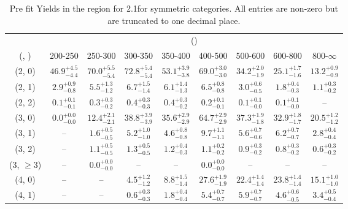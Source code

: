 \begin{table}[h!]
\tiny
\centering
\caption{Pre fit Yields in the \mmj region for 2.1\ifb for symmetric categories. All entries are non-zero but are truncated to one decimal place.\label{tab:prednodatanaive_mumu_comb_sym}}
\begin{tabular}
{ccccccccc}
	\hline\hline
	& \multicolumn{8}{c}{\scalht (\gev)} \\ 
	 (\njet,  \nb) & 200-250 & 250-300 & 300-350 & 350-400 & 400-500 & 500-600 & 600-800 & 800-$\infty$ \\ [0.8ex] 
\hline
	(2, 0) & $46.9^{+ 4.5 }_{- 4.4 }$ & $70.0^{+ 5.5 }_{- 5.4 }$ & $72.8^{+ 5.4 }_{- 5.4 }$ & $53.1^{+ 3.9 }_{- 3.8 }$ & $69.0^{+ 3.0 }_{- 3.0 }$ & $34.2^{+ 2.0 }_{- 1.9 }$ & $25.1^{+ 1.7 }_{- 1.6 }$ & $13.2^{+ 0.9 }_{- 0.9 }$ \\[0.5ex] 
	(2, 1) & $2.9^{+ 0.9 }_{- 0.8 }$ & $5.5^{+ 1.3 }_{- 1.2 }$ & $6.7^{+ 1.5 }_{- 1.4 }$ & $6.1^{+ 1.4 }_{- 1.3 }$ & $6.5^{+ 0.8 }_{- 0.8 }$ & $3.0^{+ 0.6 }_{- 0.5 }$ & $1.8^{+ 0.4 }_{- 0.3 }$ & $1.1^{+ 0.3 }_{- 0.2 }$ \\[0.5ex] 
	(2, 2) & $0.1^{+ 0.1 }_{- 0.1 }$ & $0.3^{+ 0.3 }_{- 0.2 }$ & $0.4^{+ 0.3 }_{- 0.3 }$ & $0.4^{+ 0.3 }_{- 0.2 }$ & $0.2^{+ 0.1 }_{- 0.1 }$ & $0.1^{+ 0.1 }_{- 0.0 }$ & $0.1^{+ 0.1 }_{- 0.0 }$ & -- \\[0.5ex] 
	(3, 0) & $0.0^{+ 0.0 }_{- 0.0 }$ & $12.4^{+ 2.1 }_{- 2.1 }$ & $38.8^{+ 3.9 }_{- 3.9 }$ & $35.6^{+ 2.9 }_{- 2.9 }$ & $64.7^{+ 2.9 }_{- 2.9 }$ & $37.3^{+ 1.9 }_{- 1.8 }$ & $32.9^{+ 1.8 }_{- 1.7 }$ & $20.5^{+ 1.2 }_{- 1.2 }$ \\[0.5ex] 
	(3, 1) & -- & $1.6^{+ 0.5 }_{- 0.5 }$ & $5.2^{+ 1.0 }_{- 1.0 }$ & $4.6^{+ 0.8 }_{- 0.8 }$ & $9.7^{+ 1.1 }_{- 1.1 }$ & $5.6^{+ 0.7 }_{- 0.6 }$ & $6.2^{+ 0.7 }_{- 0.7 }$ & $2.8^{+ 0.4 }_{- 0.4 }$ \\[0.5ex] 
	(3, 2) & -- & $1.1^{+ 0.5 }_{- 0.5 }$ & $1.3^{+ 0.5 }_{- 0.5 }$ & $1.2^{+ 0.4 }_{- 0.3 }$ & $1.1^{+ 0.2 }_{- 0.2 }$ & $0.9^{+ 0.3 }_{- 0.2 }$ & $0.8^{+ 0.3 }_{- 0.2 }$ & $0.6^{+ 0.3 }_{- 0.2 }$ \\[0.5ex] 
	(3, $\ge3$) & -- & $0.0^{+ 0.0 }_{- 0.0 }$ & -- & -- & $0.0^{+ 0.0 }_{- 0.0 }$ & -- & -- & -- \\[0.5ex] 
	(4, 0) & -- & -- & $4.5^{+ 1.2 }_{- 1.2 }$ & $8.8^{+ 1.5 }_{- 1.4 }$ & $27.6^{+ 1.9 }_{- 1.9 }$ & $22.4^{+ 1.4 }_{- 1.4 }$ & $23.8^{+ 1.4 }_{- 1.4 }$ & $15.1^{+ 1.0 }_{- 1.0 }$ \\[0.5ex] 
	(4, 1) & -- & -- & $0.6^{+ 0.3 }_{- 0.3 }$ & $1.8^{+ 0.4 }_{- 0.4 }$ & $5.4^{+ 0.7 }_{- 0.7 }$ & $5.9^{+ 0.7 }_{- 0.7 }$ & $4.6^{+ 0.6 }_{- 0.5 }$ & $3.4^{+ 0.5 }_{- 0.4 }$ \\[0.5ex] 

\end{tabular}
\end{table}
